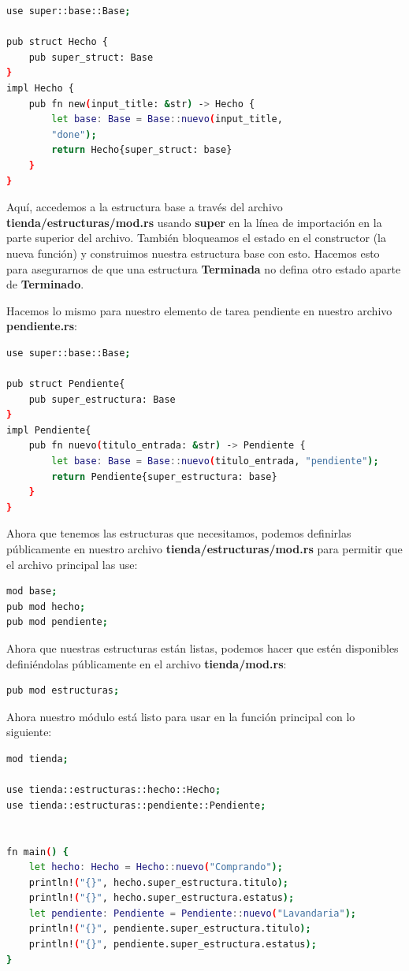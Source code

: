 \begin{lstlisting}[language=bash]
use super::base::Base;

pub struct Hecho {
	pub super_struct: Base	
}
impl Hecho {
	pub fn new(input_title: &str) -> Hecho {
		let base: Base = Base::nuevo(input_title,
		"done");
		return Hecho{super_struct: base}	
	}	
}	
\end{lstlisting}

Aquí, accedemos a la estructura base a través del archivo \textbf{tienda/estructuras/mod.rs} usando \textbf{super} en la línea de importación en la parte superior del archivo. También bloqueamos el estado en el constructor (la nueva función) y construimos nuestra estructura base con esto. Hacemos esto para asegurarnos de que una estructura \textbf{Terminada} no defina otro estado aparte de \textbf{Terminado}.

Hacemos lo mismo para nuestro elemento de tarea pendiente en nuestro archivo \textbf{pendiente.rs}:

\begin{lstlisting}[language=bash]
use super::base::Base;

pub struct Pendiente{
	pub super_estructura: Base
}
impl Pendiente{
	pub fn nuevo(titulo_entrada: &str) -> Pendiente {
		let base: Base = Base::nuevo(titulo_entrada, "pendiente");
		return Pendiente{super_estructura: base}
	}
}	
\end{lstlisting}

Ahora que tenemos las estructuras que necesitamos, podemos definirlas públicamente en nuestro archivo \textbf{tienda/estructuras/mod.rs} para permitir que el archivo principal las use:

\begin{lstlisting}[language=bash]
mod base;
pub mod hecho;
pub mod pendiente;
\end{lstlisting}

Ahora que nuestras estructuras están listas, podemos hacer que estén disponibles definiéndolas públicamente en el archivo \textbf{tienda/mod.rs}:

\begin{lstlisting}[language=bash]
pub mod estructuras;
\end{lstlisting}

Ahora nuestro módulo está listo para usar en la función principal con lo siguiente:

\begin{lstlisting}[language=bash]
mod tienda;

use tienda::estructuras::hecho::Hecho;
use tienda::estructuras::pendiente::Pendiente;


fn main() {
	let hecho: Hecho = Hecho::nuevo("Comprando");
	println!("{}", hecho.super_estructura.titulo);
	println!("{}", hecho.super_estructura.estatus);
	let pendiente: Pendiente = Pendiente::nuevo("Lavandaria");
	println!("{}", pendiente.super_estructura.titulo);
	println!("{}", pendiente.super_estructura.estatus);
}
\end{lstlisting}

